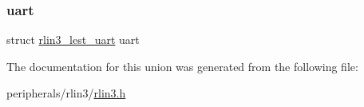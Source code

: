 \mbox{\label{unionrlin3__lest_ad3c2fc16b672914e613e25d8a094ae71}} 
\subsubsection{\texorpdfstring{uart}{uart}}
{\footnotesize\ttfamily struct \mbox{\hyperlink{structrlin3__lest__uart}{rlin3\+\_\+lest\+\_\+uart}} uart}



The documentation for this union was generated from the following file\+:\begin{DoxyCompactItemize}
\item 
peripherals/rlin3/\mbox{\hyperlink{rlin3_8h}{rlin3.\+h}}\end{DoxyCompactItemize}
